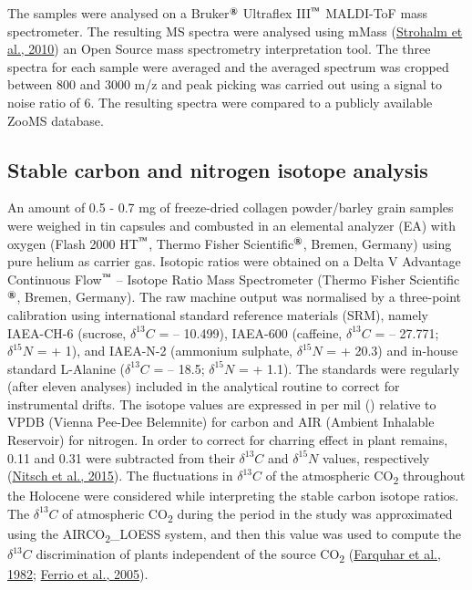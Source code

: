 \documentclass[3p]{elsarticle} %
\begin{document}
The samples were analysed on a Bruker\(^\text{\textregistered}\) Ultraflex III\(^\text{\texttrademark}\) MALDI-ToF mass spectrometer. The resulting MS spectra were analysed using mMass (\protect\hyperlink{ref-strohalm_etal10}{Strohalm et al., 2010}) an Open Source mass spectrometry interpretation tool. The three spectra for each sample were averaged and the averaged spectrum was cropped between 800 and 3000 m/z and peak picking was carried out using a signal to noise ratio of 6. The resulting spectra were compared to a publicly available ZooMS database.

\hypertarget{stable-carbon-and-nitrogen-isotope-analysis}{%
\subsection{Stable carbon and nitrogen isotope analysis}\label{stable-carbon-and-nitrogen-isotope-analysis}}

An amount of 0.5 - 0.7 mg of freeze-dried collagen powder/barley grain samples were weighed in tin capsules and combusted in an elemental analyzer (EA) with oxygen (Flash 2000 HT\(^\text{\texttrademark}\), Thermo Fisher Scientific\(^\text{\textregistered}\), Bremen, Germany) using pure helium as carrier gas. Isotopic ratios were obtained on a Delta V Advantage Continuous Flow\(^\text{\texttrademark}\) -- Isotope Ratio Mass Spectrometer (Thermo Fisher Scientific\(^\text{\textregistered}\), Bremen, Germany). The raw machine output was normalised by a three-point calibration using international standard reference materials (SRM), namely IAEA-CH-6 (sucrose, \(\delta ^{13}C\) = -- 10.499\text{\textperthousand}), IAEA-600 (caffeine, \(\delta ^{13}C\) = -- 27.771\text{\textperthousand}; \(\delta ^{15}N\) = + 1\text{\textperthousand}), and IAEA-N-2 (ammonium sulphate, \(\delta ^{15}N\) = + 20.3\text{\textperthousand}) and in-house standard L-Alanine (\(\delta ^{13}C\) = -- 18.5\text{\textperthousand}; \(\delta ^{15}N\) = + 1.1\text{\textperthousand}). The standards were regularly (after eleven analyses) included in the analytical routine to correct for instrumental drifts. The isotope values are expressed in per mil (\text{\textperthousand}) relative to VPDB (Vienna Pee-Dee Belemnite) for carbon and AIR (Ambient Inhalable Reservoir) for nitrogen. In order to correct for charring effect in plant remains, 0.11\text{\textperthousand} and 0.31\text{\textperthousand} were subtracted from their \(\delta ^{13}C\) and \(\delta ^{15}N\) values, respectively (\protect\hyperlink{ref-nitsch_etal15}{Nitsch et al., 2015}). The fluctuations in \(\delta ^{13}C\) of the atmospheric CO\textsubscript{2} throughout the Holocene were considered while interpreting the stable carbon isotope ratios. The \(\delta ^{13}C\) of atmospheric CO\textsubscript{2} during the period in the study was approximated using the AIRCO\textsubscript{2}\_LOESS system, and then this value was used to compute the \(\delta ^{13}C\) discrimination of plants independent of the source CO\textsubscript{2} (\protect\hyperlink{ref-farquhar_etal82}{Farquhar et al., 1982}; \protect\hyperlink{ref-ferrio_etal05}{Ferrio et al., 2005}).
\end{document}
